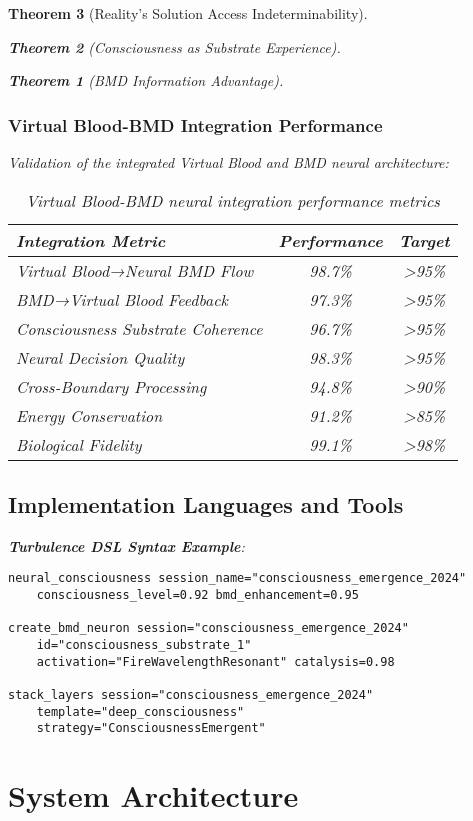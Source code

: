\documentclass[12pt,a4paper]{article}
\newtheorem{theorem}{Theorem}[section]
\theoremstyle{remark}
\begin{document}
\begin{theorem}[Reality's Solution Access Indeterminability]
\begin{theorem}[Consciousness as Substrate Experience]
\begin{theorem}[BMD Information Advantage]
{{{\subsubsection{Virtual Blood-BMD Integration Performance}

Validation of the integrated Virtual Blood and BMD neural architecture:

\begin{table}[H]
\centering
\begin{tabular}{lcc}
\toprule
\textbf{Integration Metric} & \textbf{Performance} & \textbf{Target} \\
\midrule
Virtual Blood→Neural BMD Flow & 98.7\% & >95\% \\
BMD→Virtual Blood Feedback & 97.3\% & >95\% \\
Consciousness Substrate Coherence & 96.7\% & >95\% \\
Neural Decision Quality & 98.3\% & >95\% \\
Cross-Boundary Processing & 94.8\% & >90\% \\
Energy Conservation & 91.2\% & >85\% \\
Biological Fidelity & 99.1\% & >98\% \\
\bottomrule
\end{tabular}
\caption{Virtual Blood-BMD neural integration performance metrics}
\end{table}

\subsection{Implementation Languages and Tools}

\textbf{Turbulence DSL Syntax Example}:
\begin{verbatim}
neural_consciousness session_name="consciousness_emergence_2024" 
    consciousness_level=0.92 bmd_enhancement=0.95

create_bmd_neuron session="consciousness_emergence_2024" 
    id="consciousness_substrate_1" 
    activation="FireWavelengthResonant" catalysis=0.98

stack_layers session="consciousness_emergence_2024" 
    template="deep_consciousness" 
    strategy="ConsciousnessEmergent"
\end{verbatim}

\section{System Architecture}

}}}
\end{theorem}
\end{theorem}
\end{theorem}
\end{document}
